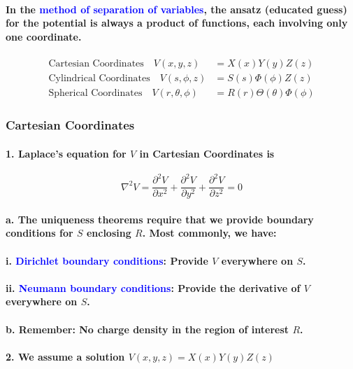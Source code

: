 \documentclass{article}
\begin{document}
\paragraph{In the \textcolor{blue}{method of separation of variables}, the ansatz (educated guess) for the potential is always a product of functions, each involving only one coordinate.}
\begin{align*}
    \text{Cartesian Coordinates}\quad V(x,y,z)&=X(x)Y(y)Z(z)\\
    \text{Cylindrical Coordinates}\quad V(s,\phi,z)&=S(s)\Phi(\phi)Z(z)\\
    \text{Spherical Coordinates}\quad V(r,\theta,\phi)&=R(r)\Theta(\theta)\Phi(\phi)
\end{align*}
\subsubsection{Cartesian Coordinates}
\paragraph{1. Laplace's equation for $V$ in Cartesian Coordinates is}
\begin{equation*}
\nabla^2V=\frac{\partial^2 V}{\partial x^2}+\frac{\partial^2 V}{\partial y^2}+\frac{\partial^2 V}{\partial z^2}=0
\end{equation*}
\paragraph{\indent a. The uniqueness theorems require that we provide boundary conditions for $S$ enclosing $R$. Most commonly, we have:}
\paragraph{\indent i. \textcolor{blue}{Dirichlet boundary conditions}: Provide $V$ everywhere on $S$.}
\paragraph{\indent ii. \textcolor{blue}{Neumann boundary conditions}: Provide the derivative of $V$ everywhere on $S$.}
\paragraph{\indent b. Remember: No charge density in the region of interest $R$.}
\paragraph{2. We assume a solution $V(x,y,z)=X(x)Y(y)Z(z)$}
\end{document}
